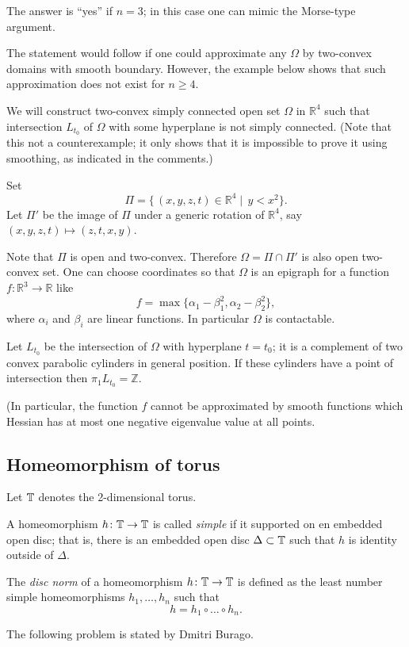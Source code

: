 The answer is ``yes'' if $n=3$; in this case one can mimic the Morse-type argument.

The statement would follow if one could approximate any $\Omega$ by two-convex domains with smooth boundary. However, the example below shows that such approximation does not exist for $n\ge 4$.


 We will construct two-convex simply connected open set $\Omega$ in $\mathbb R^4$ such that intersection $L_{t_0}$ of $\Omega$ with some hyperplane is not simply connected.
(Note that this not a counterexample;
it only shows that it is impossible to prove it using smoothing, as indicated in the comments.)

Set 
$$\Pi=\{\,(x,y,z,t)\in\mathbb R^4\mid\,y< x^2\}.$$
Let $\Pi'$ be the image of $\Pi$ under a generic rotation of $\mathbb R^4$,
say $(x,y,z,t)\mapsto(z,t,x,y)$.

Note that $\Pi$ is open and two-convex.
Therefore $\Omega=\Pi\cap \Pi'$ is also open two-convex set.
One can choose coordinates so that $\Omega$ is an epigraph for a function $f\colon\mathbb R^3\to\mathbb R$ like
$$f=\max\{\alpha_1-\beta_1^2,\alpha_2-\beta_2^2 \},$$
where $\alpha_i$ and $\beta_i$ are linear functions.
In particular $\Omega$ is contactable.

Let $L_{t_0}$ be the intersection of $\Omega$ with hyperplane $t=t_0$;
it is a complement of two convex parabolic cylinders in general position. 
If these cylinders have a point of intersection then $\pi_1 L_{t_0}=\mathbb Z$.
 
(In particular, the function $f$ cannot be approximated by smooth functions which Hessian has at most one negative eigenvalue value at all points.
 
\subsection*{Homeomorphism of torus}

Let $\mathbb{T}$ denotes the 2-dimensional torus.

A homeomorphism $h\colon\mathbb{T}\to \mathbb{T}$ is called \emph{simple} if it supported on en embedded open disc;
that is, there is an embedded open disc $\Delta\subset \mathbb{T}$ such that $h$ is identity outside of $\Delta$.

The \emph{disc norm} of a homeomorphism $h\colon\mathbb{T}\to \mathbb{T}$ is defined as the least number simple homeomorphisms $h_1,\dots,h_n$ such that
\[h=h_1\circ\dots\circ h_n.\]

The following problem is stated by Dmitri Burago.

